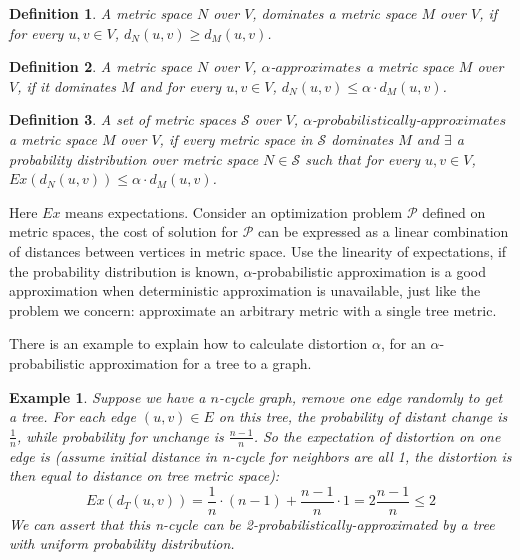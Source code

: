 \documentclass[11pt,twocolumn]{IEEEtran}
\newtheorem{Definition}{Definition}[section]
\newtheorem{Example}{Example}[section]
\begin{document}
\begin{Definition}
A metric space $N$ over $V$, \emph{dominates} a metric space $M$ over $V$, if for
every $u,v\in V$, $d_N(u,v)\geq d_M(u,v)$.
\end{Definition}
\begin{Definition}
A metric space $N$ over $V$, $\alpha$-$approximates$ a metric space $M$ over $V$, if it dominates $M$
and for every $u,v\in V$, $d_N(u,v) \leq \alpha\cdot d_M(u,v)$.
\end{Definition}
\begin{Definition}
A set of metric spaces $\mathcal{S}$ over $V$, $\alpha$-$probabilistically$-$approximates$ a metric
space $M$ over $V$, if every metric space in $\mathcal{S}$ dominates $M$ and $\exists$ a probability 
distribution over metric space $N\in \mathcal{S}$ such that for every $u,v\in V$, 
$Ex(d_N(u,v))\leq \alpha\cdot d_M(u,v)$.
\end{Definition}
Here $Ex$ means expectations. Consider an optimization problem $\mathcal{P}$ defined on metric spaces,
the cost of solution for $\mathcal{P}$ can be expressed as a linear combination of distances between
vertices in metric space.\cite{bartal98} Use the linearity of expectations, if the probability distribution is known,
$\alpha$-probabilistic approximation is a good approximation when deterministic approximation is 
unavailable, just like the problem we concern: approximate an arbitrary metric with a single tree metric.

There is an example to explain how to calculate distortion $\alpha$, for an $\alpha$-probabilistic approximation for a tree to a graph.
\begin{Example}
\label{ex:ncycle}
Suppose we have a $n$-cycle graph, remove one edge randomly to get a tree. For each edge $(u,v)\in E$ on this 
tree, the probability of distant change is $\frac{1}{n}$, while probability for unchange is $\frac{n-1}{n}$.
So the expectation of distortion on one edge is (assume initial distance in n-cycle for neighbors are all 1,
the distortion is then equal to distance on tree metric space):
$$Ex(d_T(u,v)) = \frac{1}{n}\cdot (n-1) + \frac{n-1}{n} \cdot 1 = 2\frac{n-1}{n} \leq 2$$
We can assert that this n-cycle can be \emph{2-probabilistically-approximated} by a tree with uniform probability distribution.
\end{Example}
\end{document}
